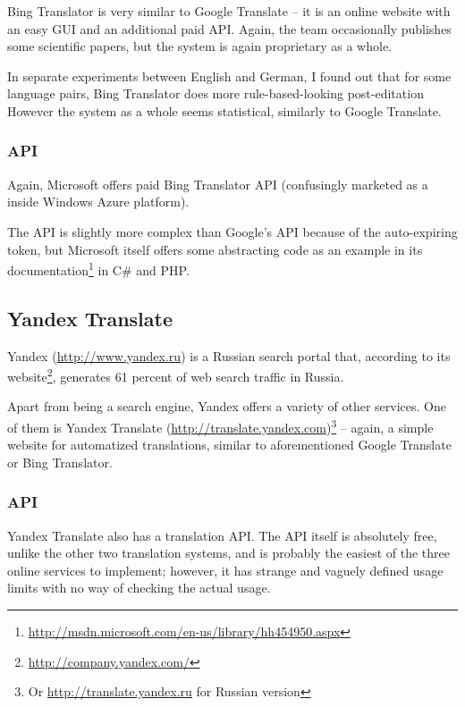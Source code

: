 Bing Translator is very similar to Google Translate -- it is an online website with an easy GUI and an additional paid API. Again, the team occasionally publishes some scientific papers, but the system is again  proprietary as a whole.

In separate experiments between English and German, I found out that for some language pairs, Bing Translator does more rule-based-looking post-editation 
However the system as a whole seems statistical, similarly to Google Translate.


\subsubsection{API}
Again, Microsoft offers paid Bing Translator API (confusingly marketed as a  inside Windows Azure platform).

The API is slightly more complex than Google's API because of the auto-expiring token, but Microsoft itself offers some abstracting code as an example in its documentation\footnote{\url{http://msdn.microsoft.com/en-us/library/hh454950.aspx}} in C\# and PHP.


\subsection{Yandex Translate}
\label{yandex}
Yandex (\url{http://www.yandex.ru}) is a Russian search portal that, according to its website\footnote{\url{http://company.yandex.com/}}, generates 61 percent of web search traffic in Russia.

Apart from being a search engine, Yandex offers a variety of other services. One of them is Yandex Translate (\url{http://translate.yandex.com})\footnote{Or \url{http://translate.yandex.ru} for Russian version} -- again, a simple website for automatized translations, similar to aforementioned Google Translate or Bing Translator.


\subsubsection{API}
Yandex Translate also has a translation API. 
The API itself is absolutely free, unlike the other two translation systems, and is probably the easiest of the three online services to implement; however, it has strange and vaguely defined usage limits with no way of checking the actual usage.

